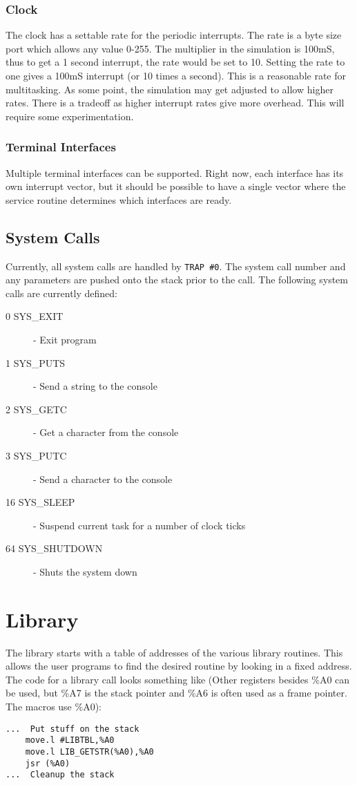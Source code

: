 \documentclass[10pt]{article}
\begin{document}
\subsubsection{Clock}
The clock has a settable rate for the periodic interrupts.  The rate is a byte size port which allows any value 0-255.  The multiplier in the simulation is 100mS, thus to get a 1 second interrupt, the rate would be set to 10.  Setting the rate to one gives a 100mS interrupt (or 10 times a second).  This is a reasonable rate for multitasking.  As some point, the simulation may get adjusted to allow higher rates.  There is a tradeoff as higher interrupt rates give more overhead.  This will require some experimentation.

\subsubsection{Terminal Interfaces}
Multiple terminal interfaces can be supported.  Right now, each interface has its own interrupt vector, but it should be possible to have a single vector where the service routine determines which interfaces are ready.

\subsection{System Calls}
Currently, all system calls are handled by \verb|TRAP #0|.  The system call number and any parameters are pushed onto the stack prior to the call.  The following system calls are currently defined:
\begin{description}
  \item[0 SYS\_EXIT] - Exit program
  \item[1 SYS\_PUTS] - Send a string to the console
  \item[2 SYS\_GETC] - Get a character from the console
  \item[3 SYS\_PUTC] - Send a character to the console
  \item[16 SYS\_SLEEP] - Suspend current task for a number of clock ticks
  \item[64 SYS\_SHUTDOWN] - Shuts the system down
\end{description}

\section{Library}
The library starts with a table of addresses of the various library routines.  This allows the user programs to find the desired routine by looking in a fixed address.  The code for a library call looks something like (Other registers besides \%A0 can be used, but \%A7 is the stack pointer and \%A6 is often used as a frame pointer.  The macros use \%A0):
\begin{lstlisting}
...  Put stuff on the stack
    move.l #LIBTBL,%A0
    move.l LIB_GETSTR(%A0),%A0
    jsr (%A0)
...  Cleanup the stack
\end{lstlisting}
\end{document}
